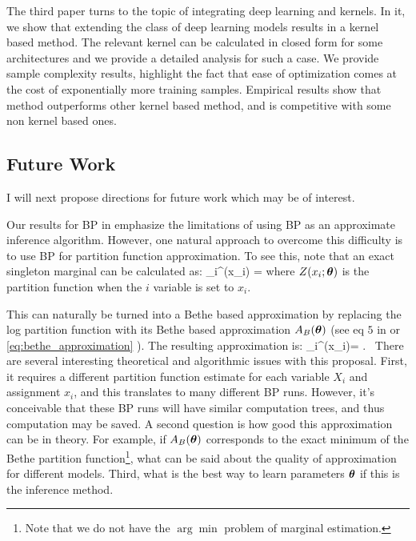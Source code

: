The third paper  turns to the topic of integrating deep learning and kernels.
In it, we show that extending the class of deep learning models results in a kernel based method.
The relevant kernel can be calculated in closed form for some architectures and we provide a detailed analysis for such a case.
We provide sample complexity results, highlight the fact that ease of optimization comes at the cost of exponentially more training samples.
Empirical results show that method outperforms other kernel based method, and is competitive with some non kernel based ones.  


\subsection{Future Work}
I will next propose directions for future work which may be of interest.

Our results for BP in  emphasize the limitations of using BP as an approximate inference algorithm. However, one natural approach to overcome this difficulty is to use BP for partition function approximation. To see this, note that an exact singleton marginal can be calculated as:
\be
\mu_i^{\thetav}(x_i) = 
\label{eq:marg_partition}
\ee
where $Z(x_i;\boldsymbol{\theta})$ 
is the partition function when the $i$ variable is set to $x_i$.  

This can naturally be turned into a Bethe based approximation by replacing the log partition function with its Bethe based approximation $A_B(\boldsymbol{\theta})$ (see eq $5$ in  or \eqref{eq:bethe_approximation} ). The resulting approximation is:
\be
\tau_i^{\thetav}(x_i)=  .~
\ee
There are several interesting theoretical and algorithmic issues with this proposal. First, it requires a different partition function estimate for each variable $X_i$ and assignment $x_i$, and this translates to many different BP runs. However, it's conceivable that these BP runs will have similar computation trees, and thus computation may be saved. A second question is how good this approximation can be in theory. For example, if $A_B(\boldsymbol{\theta})$ corresponds to the exact minimum of the Bethe partition function\footnote{Note that we do not have the $\arg\min$ problem of marginal estimation.}, what can be said about the quality of approximation for different models. Third, what is the best way to learn parameters $\boldsymbol{\theta}$ if this is the inference method.

